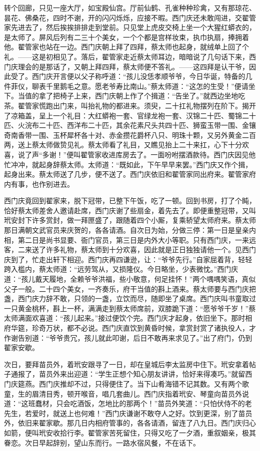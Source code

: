 转个回廊，只见一座大厅，如宝殿仙宫。厅前仙鹤、孔雀种种珍禽，又有那琼花、昙花、佛桑花，四时不谢，开的闪闪烁烁，应接不暇。西门庆还未敢闯进，交翟管家先进去了，然后挨挨排排走到堂前。只见堂上虎皮交椅上坐一个大猩红蟒衣的，是太师了。屏风后列有二三十个美女，一个个都是宫样妆束，执巾执扇，捧拥着他。翟管家也站在一边。西门庆朝上拜了四拜，蔡太师也起身，就绒单上回了个礼。——这是初相见了。落后，翟管家走近蔡太师耳边，暗暗说了几句话下来，西门庆理会的是那话了，又朝上拜四拜，蔡太师便不答礼。——这四拜是认干爷，因此受了。西门庆开言便以父子称呼道：“孩儿没恁孝顺爷爷，今日华诞，特备的几件菲仪，聊表千里鹅毛之意。愿老爷寿比南山。”蔡太师道：“这怎的生受！”便请坐下。当值的拿了把椅子上来，西门庆朝上作了个揖道：“告坐了。”就西边坐地吃茶。翟管家慌跑出门来，叫抬礼物的都进来。须臾，二十扛礼物摆列在阶下。揭开了凉箱盖，呈上一个礼目：大红蟒袍一套、官绿龙袍一套、汉锦二十匹、蜀锦二十匹、火浣布二十匹、西洋布二十匹，其余花素尺头共四十匹、狮蛮玉带一围、金镶奇南香带一围、玉杯犀杯各十对、赤金攒花爵杯八只、明珠十颗，又另外黄金二百两，送上蔡太师做贽见礼。蔡太师看了礼目，又瞧见抬上二十来扛，心下十分欢喜，说了声“多谢！”便叫翟管家收进库房去了。一面吩咐摆酒款待。西门庆因见他忙冲冲，就起身辞蔡太师。太师道：“既如此，下午早早来罢。”西门庆又作个揖，起身出来。蔡太师送了几步，便不送了。西门庆依旧和翟管家同出府来。翟管家府内有事，也作别进去。

西门庆竟回到翟家来，脱下冠带，已整下午饭，吃了一顿。回到书房，打了个盹，恰好蔡太师差舍人邀请赴席，西门庆谢了些扇金，着先去了。即便重整冠带，又叫玳安封下许多赏封，做一拜匣盛了，跟随着四个小厮，复乘轿望太师府来。蔡太师那日满朝文武官员来庆贺的，各各请酒。自次日为始，分做三停：第一日是皇亲内相，第二日是尚书显要、衙门官员，第三日是内外大小等职。只有西门庆，一来远客，二来送了许多礼物，蔡太师到十分欢喜，因此就是正日独独请他一个。见西门庆到了，忙走出轩下相迎。西门庆再四谦逊，让：“爷爷先行。”自家屈着背，轻轻跨入槛内，蔡太师道：“远劳驾从，又损隆仪。今日略坐，少表微忱。”西门庆道：“孩儿戴天履地，全赖爷爷洪福，些小敬意，何足挂怀！”两个喁喁笑语，真似父子一般。二十四个美女，一齐奏乐，府干当值的斟上酒来。蔡太师要与西门庆把盏，西门庆力辞不敢，只领的一盏，立饮而尽，随即坐了桌席。西门庆叫书童取过一只黄金桃杯，斟上一杯，满满走到蔡太师席前，双膝跪下道：“愿爷爷千岁！”蔡太师满面欢喜道：“孩儿起来。”接过便饮个完。西门庆才起身，依旧坐下。那时相府华筵，珍奇万状，都不必说。西门庆直饮到黄昏时候，拿赏封赏了诸执役人，才作谢告别道：“爷爷贵冗，孩儿就此叩谢，后日不敢再来求见了。”出了府门，仍到翟家安歇。

次日，要拜苗员外，着玳安跟寻了一日，却在皇城后李太监房中住下。玳安拿着帖子通报了，苗员外来出迎道：“学生正想个知心朋友讲讲，恰好来得凑巧。”就留西门庆筵燕。西门庆推却不过，只得便住了。当下山肴海错不记其数。又有两个歌童，生的眉清目秀，顿开喉音，唱几套曲儿。西门庆指着玳安、琴童向苗员外说道：“这班蠢材，只会吃酒饭，怎地比的那两个！”苗员外笑道：“只怕伏侍不的老先生，若爱时，就送上也何难！”西门庆谦谢不敢夺人之好。饮到更深，别了苗员外，依旧来翟家歇。那几日内相府管事的，各各请酒，留连了八九日。西门庆归心如箭，便叫玳安收拾行李。翟管家苦死留住，只得又吃了一夕酒，重叙姻亲，极其眷恋。次日早起辞别，望山东而行。一路水宿风餐，不在话下。

